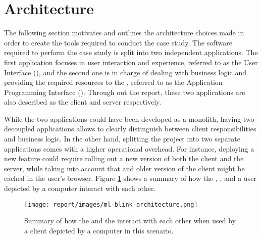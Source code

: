 \section{Architecture} \label{sect:case-study:arch}

The following section motivates and outlines the architecture choices made in order to create the tools required to conduct the case study. The software required to perform the case study is split into two independent applications. The first application focuses in user interaction and experience, referred to as the \mlblink User Interface (\mlblinkui), and the second one is in charge of dealing with business logic and providing the required resources to the \mlblinkui, referred to as the \mlblink Application Programming Interface (\mlblinkapi). Through out the report, these two applications are also described as the client and server respectively.

While the two applications could have been developed as a monolith, having two decoupled applications allows to clearly distinguish between client responsibilities and business logic. In the other hand, splitting the project into two separate applications comes with a higher operational overhead. For instance, deploying a new feature could require rolling out a new version of both the client and the server, while taking into account that and older version of the client might be cached in the user's browser. Figure \ref{fig:ml-blink-architecture} shows a summary of how the \mlblinkui, \mlblinkapi, and a user depicted by a computer interact with each other.


\begin{figure}[H]
  \centering
  \texttt{[image: report/images/ml-blink-architecture.png]}
  \caption{Summary of how the \mlblinkui and the \mlblinkapi interact with each other when used by a client depicted by a computer in this scenario.}
  \label{fig:ml-blink-architecture}
\end{figure}